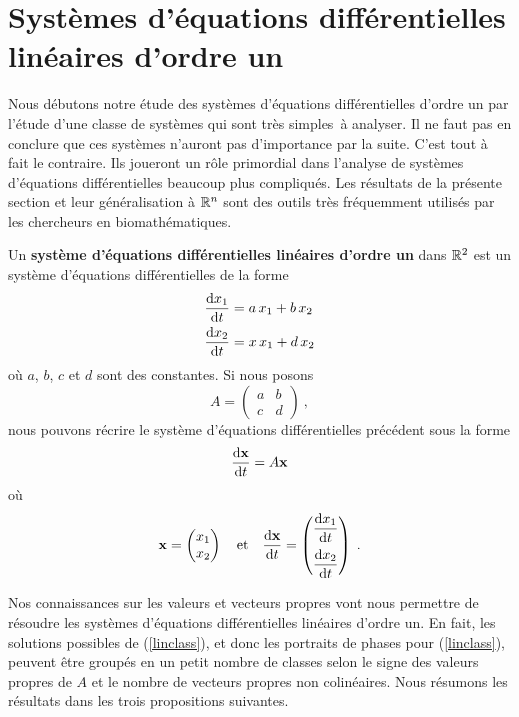 {\section{Systèmes d'équations différentielles linéaires d'ordre un}

Nous débutons notre étude des systèmes d'équations différentielles
d'ordre un par l'étude d'une classe de systèmes qui sont \lgm très
simples\rgm\ à analyser.  Il ne faut pas en conclure que ces systèmes
n'auront pas d'importance par la suite.  C'est tout à fait le
contraire.  Ils joueront un rôle primordial dans l'analyse de systèmes
d'équations différentielles beaucoup plus compliqués. Les résultats de
la présente section et leur généralisation à $\mathbb{R}^n$ sont des outils
très fréquemment utilisés par les chercheurs en biomathématiques.

Un {\bfseries système d'équations différentielles linéaires d'ordre
un} dans
$\mathbb{R}^2$ est un système d'équations différentielles de la forme
\begin{align*}
\frac{\mathrm{d}x_1}{\mathrm{d}t} &= a\,x_1 + b\, x_2 \\
\frac{\mathrm{d}x_2}{\mathrm{d}t} &= x\,x_1 + d\, x_2
\end{align*}
où $a$, $b$, $c$ et $d$ sont des constantes.  Si nous posons
\[
A = \begin{pmatrix} a & b \\ c & d \end{pmatrix} \ ,
\]
nous pouvons récrire le système d'équations différentielles précédent sous la
forme
\begin{equation} \label{linclass}
\frac{\mathrm{d}\mathbf{x}}{\mathrm{d}t} = A \mathbf{x}
\end{equation}
où
\[
\mathbf{x} = \begin{pmatrix} x_1 \\ x_2 \end{pmatrix}
\quad \text{et} \quad
\frac{\mathrm{d}\mathbf{x}}{\mathrm{d}t} = 
\begin{pmatrix} \displaystyle \frac{\mathrm{d}x_1}{\mathrm{d}t} \\[2ex]
\displaystyle \frac{\mathrm{d}x_2}{\mathrm{d}t} \end{pmatrix} \; .
\]

Nos connaissances sur les valeurs et vecteurs propres vont nous
permettre de résoudre les systèmes d'équations différentielles
linéaires d'ordre un.  En fait, les solutions possibles de
(\ref{linclass}), et donc les portraits de phases pour
(\ref{linclass}), peuvent être groupés en un petit nombre de classes
selon le signe des valeurs propres de $A$ et le nombre de vecteurs
propres non colinéaires.  Nous résumons les résultats dans les trois
propositions suivantes.

}
